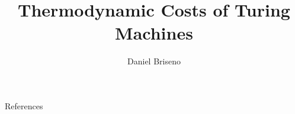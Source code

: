 \documentclass{beamer}
\title{Thermodynamic Costs of Turing Machines \parencite{Kolchinsky_2020}}
\author{Daniel Briseno}
\begin{document}
\frame{\titlepage}
















\begin{frame}{References}
	\printbibliography
\end{frame}
\end{document}
